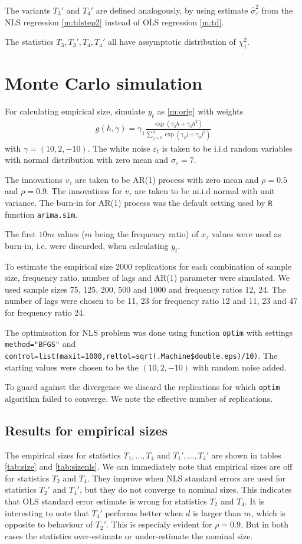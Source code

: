 \documentclass{article}
\begin{document}
The variants $T_3'$ and $T_4'$ are defined analogously, by using estimate $\hat\sigma^2_{\varepsilon}$ from the NLS regression \eqref{m:tdstep2} instead of OLS regression \eqref{m:td}.

The statistics $T_3,T_3',T_4, T_4'$ all have assymptotic distribution of $\chi^2_1$.

\section{Monte Carlo simulation}

For calculating empirical size, simulate $y_t$ as \eqref{m:orig} with weights
\begin{align}\label{w:nealmon}
    g(h,\gamma)=\gamma_1\frac{\exp(\gamma_2h+\gamma_3h^2)}{\sum_{j=0}^d\exp(\gamma_2j+\gamma_3j^2)}
\end{align}
with $\gamma=(10,2,-10)$. The white noise $\varepsilon_t$ is taken to be i.i.d random variables with normal distribution with zero mean and $\sigma_{\varepsilon}=7$.

The innovations $v_\tau$ are taken to be AR(1) process with zero mean and $\rho=0.5$ and $\rho=0.9$. The innovations for $v_\tau$ are taken to be ni.i.d normal with unit variance.  The burn-in for AR(1) process was the default setting used by \verb|R| function \verb|arima.sim|. 

The first $10m$ values ($m$ being the frequency ratio) of $x_\tau$ values were used as burn-in, i.e. were discarded, when calculating $y_t$.  

To estimate the empirical size 2000 replications for each combination of sample size, frequency ratio, number of lags and AR(1) parameter were simulated. We used sample sizes 75, 125, 200, 500 and 1000 and frequency ratios 12, 24.  The number of lags were chosen to be 11, 23 for frequency ratio 12 and 11, 23 and 47 for frequency ratio 24.

The optimisation for NLS problem was done using function \verb|optim|
with settings \verb|method="BFGS"| and
\verb|control=list(maxit=1000,reltol=sqrt(.Machine$double.eps)/10)|. The
starting values were chosen to be the $(10,2,-10)$ with random noise added.

To guard against the divergence we discard the replications for which
\verb|optim| algorithm failed to converge. We note the effective
number of replications. 

\subsection{Results for empirical sizes}
The empirical sizes for statistics $T_1,...,T_4$ and $T_1',...,T_4'$
are shown in tables \ref{tab:size} and \ref{tab:sizenls}. We can
immediately note that empirical sizes are off for statistics $T_2$ and
$T_4$. They improve when NLS standard errors are used for statistics
$T_2'$ and $T_4'$, but they do not converge to nominal sizes. This
indicates that OLS standard error estimate is wrong for statistics
$T_2$ and $T_4$. It is interesting to note that $T_4'$ performs better
when $d$ is larger than $m$, which is opposite to behaviour of
$T_2'$. This is especialy evident for $\rho=0.9$. But in both cases
the statistics over-estimate or under-estimate the nominal size. 
\end{document}
